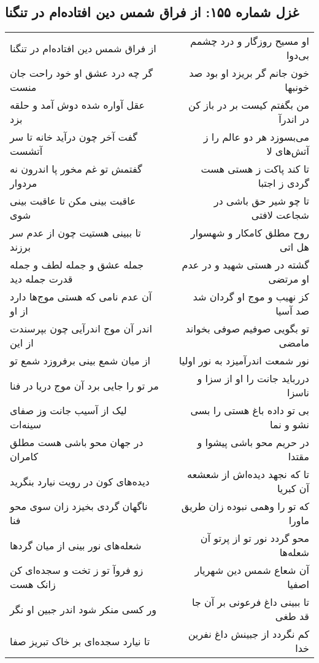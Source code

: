 \begin{center}
\section*{غزل شماره ۱۵۵: از فراق شمس دین افتاده‌ام در تنگنا}
\label{sec:0155}
\begin{longtable}{l p{0.5cm} r}
از فراق شمس دین افتاده‌ام در تنگنا
&&
او مسیح روزگار و درد چشمم بی‌دوا
\\
گر چه درد عشق او خود راحت جان منست
&&
خون جانم گر بریزد او بود صد خونبها
\\
عقل آواره شده دوش آمد و حلقه بزد
&&
من بگفتم کیست بر در باز کن در اندرآ
\\
گفت آخر چون درآید خانه تا سر آتشست
&&
می‌بسوزد هر دو عالم را ز آتش‌های لا
\\
گفتمش تو غم مخور پا اندرون نه مردوار
&&
تا کند پاکت ز هستی هست گردی ز اجتبا
\\
عاقبت بینی مکن تا عاقبت بینی شوی
&&
تا چو شیر حق باشی در شجاعت لافتی
\\
تا ببینی هستیت چون از عدم سر برزند
&&
روح مطلق کامکار و شهسوار هل اتی
\\
جمله عشق و جمله لطف و جمله قدرت جمله دید
&&
گشته در هستی شهید و در عدم او مرتضی
\\
آن عدم نامی که هستی موج‌ها دارد از او
&&
کز نهیب و موج او گردان شد صد آسیا
\\
اندر آن موج اندرآیی چون بپرسندت از این
&&
تو بگویی صوفیم صوفی بخواند مامضی
\\
از میان شمع بینی برفروزد شمع تو
&&
نور شمعت اندرآمیزد به نور اولیا
\\
مر تو را جایی برد آن موج دریا در فنا
&&
دررباید جانت را او از سزا و ناسزا
\\
لیک از آسیب جانت وز صفای سینه‌ات
&&
بی تو داده باغ هستی را بسی نشو و نما
\\
در جهان محو باشی هست مطلق کامران
&&
در حریم محو باشی پیشوا و مقتدا
\\
دیده‌های کون در رویت نیارد بنگرید
&&
تا که نجهد دیده‌اش از شعشعه آن کبریا
\\
ناگهان گردی بخیزد زان سوی محو فنا
&&
که تو را وهمی نبوده زان طریق ماورا
\\
شعله‌های نور بینی از میان گردها
&&
محو گردد نور تو از پرتو آن شعله‌ها
\\
زو فروآ تو ز تخت و سجده‌ای کن زانک هست
&&
آن شعاع شمس دین شهریار اصفیا
\\
ور کسی منکر شود اندر جبین او نگر
&&
تا ببینی داغ فرعونی بر آن جا قد طغی
\\
تا نیارد سجده‌ای بر خاک تبریز صفا
&&
کم نگردد از جبینش داغ نفرین خدا
\\
\end{longtable}
\end{center}

